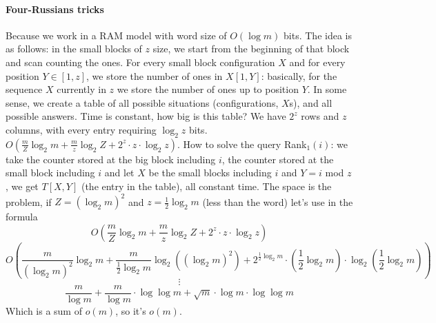 \documentclass[10pt]{report}
\begin{document}
\paragraph{Four-Russians tricks} Because we work in a RAM model with word size of $O(\log m)$ bits. The idea is as follows: in the small blocks of $z$ size, we start from the beginning of that block and scan counting the ones. For every small block configuration $X$ and for every position $Y\in[1,z]$, we store the number of ones in $X[1,Y]$: basically, for the sequence $X$ currently in $z$ we store the number of ones up to position $Y$. In some sense, we create a table of all possible situations (configurations, $X$s), and all possible answers. Time is constant, how big is this table? We have $2^z$ rows and $z$ columns, with every entry requiring $\log_2 z$ bits.\\
$O\left(\frac{m}{Z}\log_2 m + \frac{m}{z}\log_2 Z + 2^z\cdot z\cdot\log_2 z\right)$. How to solve the query Rank$_1(i)$: we take the counter stored at the big block including $i$, the counter stored at the small block including $i$ and let $X$ be the small blocks including $i$ and $Y=i$ mod $z$, we get $T[X,Y]$ (the entry in the table), all constant time. The space is the problem, if $Z=(\log_2 m)^2$ and $z = \frac{1}{2}\log_2 m$ (less than the word) let's use in the formula
$$O\left(\frac{m}{Z}\log_2 m + \frac{m}{z}\log_2 Z + 2^z\cdot z\cdot\log_2 z\right)$$
$$O\left(\frac{m}{(\log_2 m)^2}\log_2 m + \frac{m}{\frac{1}{2}\log_2 m}\log_2 ((\log_2 m)^2) + 2^{\frac{1}{2}\log_2 m}\cdot (\frac{1}{2}\log_2 m)\cdot\log_2 (\frac{1}{2}\log_2 m)\right)$$
$$\vdots$$
$$\frac{m}{\log m}+\frac{m}{\log m}\cdot\log\log m + \sqrt{m}\cdot\log m\cdot\log\log m$$
Which is a sum of $o(m)$, so it's $o(m)$.
\end{document}

